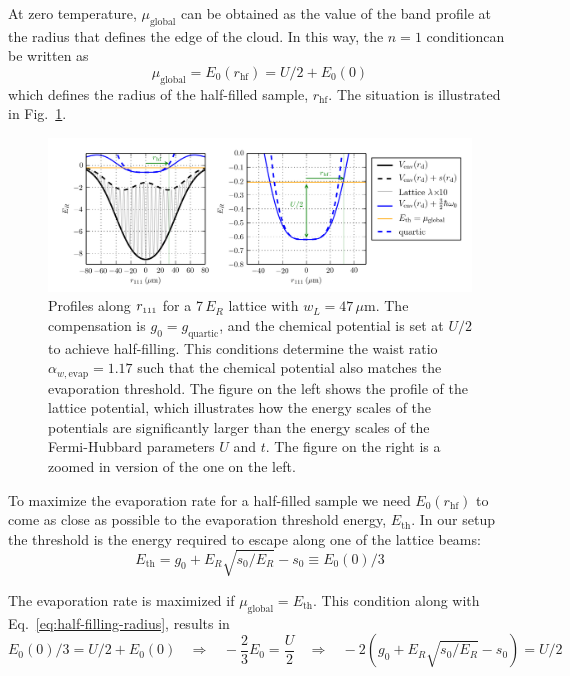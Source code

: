 \documentclass[11pt,letter]{article}
\newcommand{\rdiag}{\ensuremath{ r_{\text{\tiny{111}}} } }
\newcommand{\awaistevap}{\ensuremath{ \alpha_{w,\text{evap}} }}
\begin{document}
At zero temperature, $\mu_{\text{global}}$  can be obtained as the
value of the band profile at the radius that defines the edge of the cloud.  In
this way, the $n=1$ conditioncan be written as 
\begin{equation}
    \mu_{\text{global}} =  E_{0}(r_{\text{hf}}) = U/2 +  E_{0}(0) 
  \label{eq:half-filling-radius} 
\end{equation} 
which defines the radius of the half-filled sample, $r_{\text{hf}}$.  The situation is illustrated in Fig.~\ref{fig:lattice_general-comp}. 
\begin{figure}
    \centering
\includegraphics[width=1.0\textwidth]{figures/lattice_general-comp.png}
\caption{Profiles along $\rdiag$ for a 7\,$E_{R}$ lattice with
$w_{L}=47\,\mu$m.  The compensation is $g_{0}=g_{\text{quartic}}$, and the
chemical potential is set at $U/2$ to achieve half-filling.  This conditions
determine the waist ratio $\awaistevap=1.17$ such that the chemical potential
also matches the evaporation threshold.  The figure on the left shows the
profile of the  lattice potential, which illustrates how the energy scales of
the potentials are significantly larger than the energy scales of the
Fermi-Hubbard parameters $U$ and $t$.   The figure on the right is a zoomed in
version of the one on the left.   }
\label{fig:lattice_general-comp}
\end{figure}


To maximize the evaporation rate for a half-filled sample we need
$E_{0}(r_{\text{hf}})$ to come as close as possible to the evaporation
threshold energy, $E_{\text{th}}$.  In our setup the threshold is the energy
required to escape along one of the lattice beams: 
\begin{equation} 
  E_{\text{th}} =  g_{0} + E_{R}\sqrt{s_{0}/E_{R}} - s_{0}  \equiv E_{0}(0)/3 
\end{equation}

The evaporation rate is maximized if  $\mu_{\text{global}} = E_{\text{th}} $.
This condition along with Eq.~\ref{eq:half-filling-radius}, results in
\begin{equation}
  E_{0}(0)/3  = U/2 + E_{0}(0) 
   \ \ \ \  \Rightarrow \ \ \ \ 
   -\frac{2}{3} E_{0} = \frac{U}{2} 
   \ \ \ \  \Rightarrow \ \ \ \  
  -2( g_{0} + E_{R}\sqrt{s_{0}/E_{R}} - s_{0} ) = U/2  
  \label{eq:optimal-evap} 
\end{equation} 
 
\end{document}
